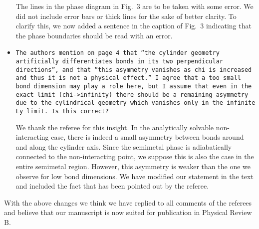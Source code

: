 \documentclass[aps,prb,superscriptaddress]{revtex4}
\begin{document}
\begin{itemize}
The lines in the phase diagram in Fig.~3 are to be taken with some error. We did not include error bars or thick lines for the sake of better clarity. To clarify this, we now added a sentence in the caption of Fig.~3 indicating that the phase boundaries should be read with an error.

\item{\tt The authors mention on page 4 that “the cylinder geometry
artificially differentiates bonds in its two perpendicular
directions”, and that “this asymmetry vanishes as chi is increased and
thus it is not a physical effect.” I agree that a too small bond
dimension may play a role here, but I assume that even in the exact
limit (chi->infinity) there should be a remaining asymmetry due to the
cylindrical geometry which vanishes only in the infinite Ly limit. Is
this correct?}

We thank the referee for this insight. In the analytically solvable non-interacting case, there is indeed a small asymmetry between bonds around and along the cylinder axis. Since the semimetal phase is adiabatically connected to the non-interacting point, we suppose this is also the case in the entire semimetal region. However, this asymmetry is weaker than the one we observe for low bond dimensions. We have modified our statement in the text and included the fact that has been pointed out by the referee.

\end{itemize}


With the above changes we think we have replied to all comments of the referees and believe that our manuscript is now suited for publication in Physical Review B. 
\end{document}
